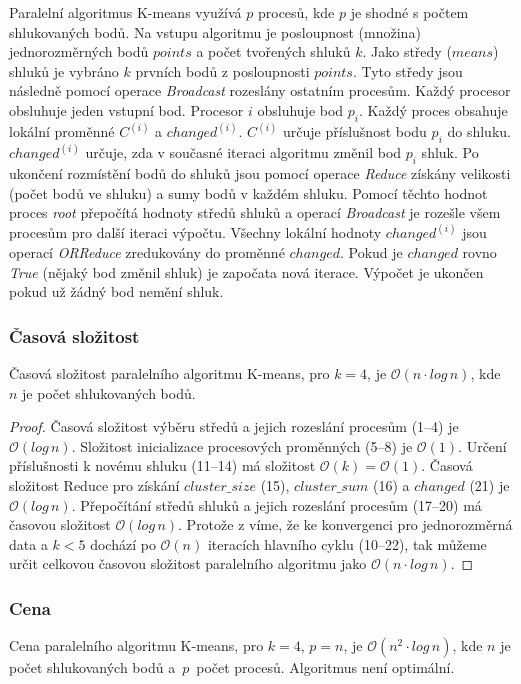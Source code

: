 \documentclass[a4paper, 11pt, fleqn]{scrartcl}
\begin{document}
      Paralelní algoritmus K-means využívá $p$ procesů, kde $p$ je shodné s počtem shlukovaných bodů. Na vstupu algoritmu je posloupnost (množina) jednorozměrných bodů $points$ a počet tvořených shluků $k$. Jako středy ($means$) shluků je vybráno $k$ prvních bodů z posloupnosti $points$. Tyto středy jsou následně pomocí operace \textit{Broadcast} rozeslány ostatním procesům. Každý procesor obsluhuje jeden vstupní bod. Procesor $i$ obsluhuje bod $p_i$. Každý proces obsahuje lokální proměnné $C^{(i)}$ a $changed^{(i)}$. $C^{(i)}$ určuje příslušnost bodu $p_i$ do shluku. $changed^{(i)}$ určuje, zda v současné iteraci algoritmu změnil bod $p_i$ shluk. Po ukončení rozmístění bodů do shluků jsou pomocí operace \textit{Reduce} získány velikosti (počet bodů ve shluku) a sumy bodů v každém shluku. Pomocí těchto hodnot proces \textit{root} přepočítá hodnoty středů shluků a operací \textit{Broadcast} je rozešle všem procesům pro další iteraci výpočtu. Všechny lokální hodnoty $changed^{(i)}$ jsou operací \textit{ORReduce} zredukovány do proměnné $changed$. Pokud je $changed$ rovno \textit{True} (nějaký bod změnil shluk) je započata nová iterace. Výpočet  je ukončen pokud už žádný bod nemění shluk.

      \subsubsection{Časová složitost}
        Časová složitost paralelního algoritmu K-means, pro $k = 4$, je $\mathcal{O}(n\cdot log\, n)$, kde $n$ je počet shlukovaných bodů.

        \begin{proof}
          Časová složitost výběru středů a jejich rozeslání procesům (1--4) je $\mathcal{O}(log\, n)$. Složitost inicializace procesových proměnných (5--8) je $\mathcal{O}(1)$. Určení příslušnosti k novému shluku (11--14) má složitost $\mathcal{O}(k) = \mathcal{O}(1)$. Časová složitost Reduce pro získání $cluster\_size$ (15), $cluster\_sum$ (16) a $changed$ (21) je $\mathcal{O}(log\, n)$. Přepočítání středů shluků a jejich rozeslání procesům (17--20) má časovou složitost $\mathcal{O}(log\, n)$. Protože z \cite{fast} víme, že ke konvergenci pro jednorozměrná data a $k < 5$ dochází po $\mathcal{O}(n)$ iteracích hlavního cyklu (10--22), tak můžeme určit celkovou časovou složitost paralelního algoritmu jako $\mathcal{O}(n\cdot log\, n)$.
        \end{proof}


      \subsubsection{Cena}
        Cena paralelního algoritmu K-means, pro $k = 4$, $p = n$, je $\mathcal{O}(n^2\cdot log\, n)$, kde $n$ je počet shlukovaných bodů a~$p$~počet procesů. Algoritmus není optimální.
\end{document}

